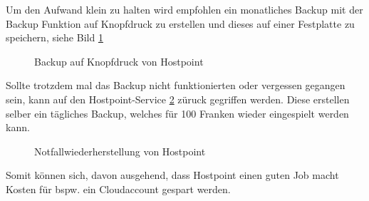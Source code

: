 Um den Aufwand klein zu halten wird empfohlen ein monatliches Backup mit der Backup Funktion auf Knopfdruck zu erstellen und dieses auf einer Festplatte zu speichern, siehe Bild \ref{img:Backup_Funktion} 
\begin{figure}[h!]
	\centering
	\caption{Backup auf Knopfdruck von Hostpoint}
	\label{img:Backup_Funktion}
\end{figure}
Sollte trotzdem mal das Backup nicht funktionierten oder vergessen gegangen sein, kann auf den Hostpoint-Service \ref{img:Notfallwiederherstellung}  züruck gegriffen werden. Diese erstellen selber ein tägliches Backup, welches für 100 Franken wieder eingespielt werden kann.
\begin{figure}[h!]
	\centering
	\caption{Notfallwiederherstellung von Hostpoint}
	\label{img:Notfallwiederherstellung}
\end{figure}
Somit können sich, davon ausgehend, dass Hostpoint einen guten Job macht Kosten für bspw. ein Cloudaccount gespart werden.



